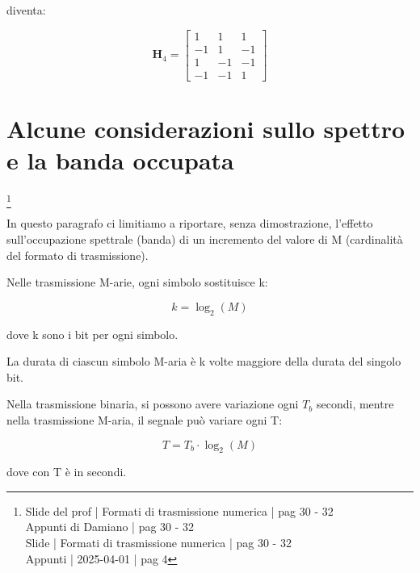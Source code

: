 diventa: 

{
    \Large 
    \begin{equation}
          \textbf{H}_{4}
        =
        \begin{bmatrix}
            1 & 1 & 1 \\
            -1 & 1 & -1 \\
            1 & -1 & -1 \\
            -1 & -1 & 1 
        \end{bmatrix}
    \end{equation}
}

\newpage 

\section{Alcune considerazioni sullo spettro e la banda occupata}
\footnote{Slide del prof | Formati di trasmissione numerica | pag 30 - 32\\  
Appunti di Damiano | pag 30 - 32\\
Slide | Formati di trasmissione numerica | pag  30 - 32\\
Appunti | 2025-04-01 | pag 4
}

In questo paragrafo ci limitiamo a riportare, senza dimostrazione, l'effetto sull'occupazione spettrale (banda) di un incremento del valore di M (cardinalità del formato di trasmissione). \newline 

Nelle trasmissione M-arie, 
ogni simbolo sostituisce k: 

{
    \Large 
    \begin{equation}
        k = \log_{2} (M)
    \end{equation}
}

dove k sono i bit per ogni simbolo. \newline

La durata di ciascun simbolo M-aria è k volte maggiore della durata del singolo bit. \newline 

Nella trasmissione binaria, si possono avere variazione ogni $T_b$ secondi, 
mentre nella trasmissione M-aria, il segnale può variare ogni T: 

{
    \Large 
    \begin{equation}
        T = T_b \cdot \log_{2} (M)
    \end{equation}
}

dove con T è in secondi. \newline 

